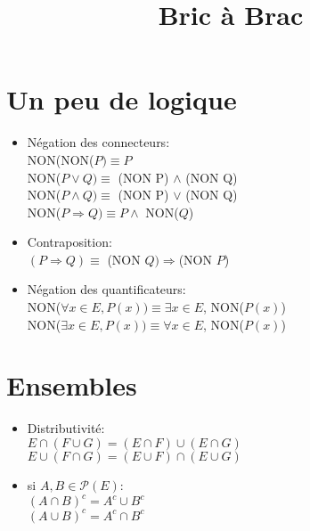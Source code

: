 \documentclass[fleqn]{article}
\title{Bric \`a Brac}
\date{}
\begin{document}
\maketitle

\section{Un peu de logique}
\begin{itemize}
	\item N\'egation des connecteurs: \\
		NON(NON(\(P) \equiv  P\) \\
		NON(\(P \lor Q) \equiv \) (NON P) \(\land\) (NON Q) \\
		NON(\(P \land Q) \equiv \) (NON P) \(\lor\) (NON Q) \\
		NON(\(P \Rightarrow Q) \equiv P \land\) NON(\(Q\))
	\item Contraposition: \\
		\((P \Rightarrow Q) \equiv\) (NON \(Q)\Rightarrow\)(NON \(P\))
	\item N\'egation des quantificateurs: \\
		NON(\(\forall x \in E, P(x)) \equiv \exists x \in E\), NON(\(P(x)\)) \\
		NON(\(\exists x \in E, P(x)) \equiv \forall x \in E\), NON(\(P(x)\))
\end{itemize}

\section{Ensembles}
\begin{itemize}
	\item Distributivit\'e: \\
		\(E \cap(F \cup G) = (E \cap F) \cup (E \cap G)\) \\
		\(E \cup (F \cap G) = (E \cup F) \cap (E \cup G)\)
	\item si \(A, B \in \mathcal{P}(E)\): \\
		\((A \cap B)^c = A^c \cup B^c\) \\
		\((A \cup B)^c = A^c \cap B^c\)
\end{itemize}
\end{document}

